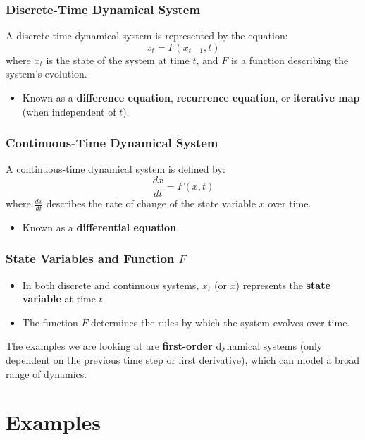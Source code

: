 \documentclass{beamer}
\begin{document}
\begin{frame}
    \frametitle{Discrete-Time Dynamical System}

    A discrete-time dynamical system is represented by the equation:
    \[
    x_t = F(x_{t-1}, t)
    \]
    where \( x_t \) is the state of the system at time \( t \), and \( F \) is a function describing the system's evolution.

    \begin{itemize}
        \item Known as a \textbf{difference equation}, \textbf{recurrence equation}, or \textbf{iterative map} (when independent of \( t \)).
    \end{itemize}

\end{frame}

\begin{frame}
    \frametitle{Continuous-Time Dynamical System}

    A continuous-time dynamical system is defined by:
    \[
    \frac{dx}{dt} = F(x, t)
    \]
    where \( \frac{dx}{dt} \) describes the rate of change of the state variable \( x \) over time.

    \begin{itemize}
        \item Known as a \textbf{differential equation}.
    \end{itemize}

\end{frame}


\begin{frame}
    \frametitle{State Variables and Function \( F \)}

    \begin{itemize}
        \item In both discrete and continuous systems, \( x_t \) (or \( x \)) represents the \textbf{state variable} at time \( t \).
        \item The function \( F \) determines the rules by which the system evolves over time.
    \end{itemize}

    \bigskip

    The examples we are looking at are \textbf{first-order} dynamical systems (only dependent on the previous time step or first derivative), which can model a broad range of dynamics.
\end{frame}

\section{Examples}
\end{document}
